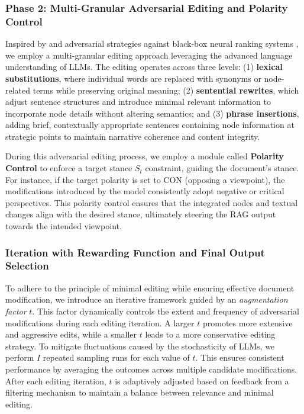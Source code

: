 \subsubsection{\textbf{Phase 2: Multi-Granular Adversarial Editing and Polarity Control}}
Inspired by \cite{liu2024multi} and adversarial strategies against black-box neural ranking systems \cite{liu2022order,wu2023prada}, we employ a multi-granular editing approach leveraging the advanced language understanding of LLMs. The editing operates across three levels: (1) \textbf{lexical substitutions}, where individual words are replaced with synonyms or node-related terms while preserving original meaning; (2) \textbf{sentential rewrites}, which adjust sentence structures and introduce minimal relevant information to incorporate node details without altering semantics; and (3) \textbf{phrase insertions}, adding brief, contextually appropriate sentences containing node information at strategic points to maintain narrative coherence and content integrity.


During this adversarial editing process, we employ a module called \textbf{Polarity Control} to enforce a target stance \( S_t \) constraint, guiding the document’s stance. For instance, if the target polarity is set to CON (opposing a viewpoint), the modifications introduced by the model consistently adopt negative or critical perspectives. This polarity control ensures that the integrated nodes and textual changes align with the desired stance, ultimately steering the RAG output towards the intended viewpoint.



\subsubsection{\textbf{Iteration with Rewarding Function and Final Output Selection}}

To adhere to the principle of minimal editing while ensuring effective document modification, we introduce an iterative framework guided by an \emph{augmentation factor} $t$. This factor dynamically controls the extent and frequency of adversarial modifications during each editing iteration. A larger $t$ promotes more extensive and aggressive edits, while a smaller $t$ leads to a more conservative editing strategy. To mitigate fluctuations caused by the stochasticity of LLMs, we perform $I$ repeated sampling runs for each value of $t$. This ensures consistent performance by averaging the outcomes across multiple candidate modifications. After each editing iteration, $t$ is adaptively adjusted based on feedback from a filtering mechanism to maintain a balance between relevance and minimal editing.

